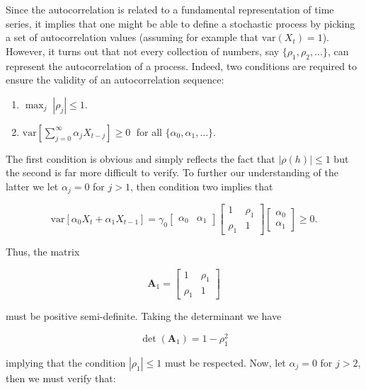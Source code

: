\documentclass[]{book}
\providecommand{\tightlist}{%
  \setlength{\itemsep}{0pt}\setlength{\parskip}{0pt}}
\theoremstyle{definition}
\theoremstyle{definition}
\theoremstyle{definition}
\theoremstyle{remark}
\begin{document}
Since the autocorrelation is related to a fundamental representation of
time series, it implies that one might be able to define a stochastic
process by picking a set of autocorrelation values (assuming for example
that \(\text{var}(X_t) = 1\)). However, it turns out that not every
collection of numbers, say \(\{\rho_1, \rho_2, ...\}\), can represent
the autocorrelation of a process. Indeed, two conditions are required to
ensure the validity of an autocorrelation sequence:

\begin{enumerate}
\def\labelenumi{\arabic{enumi}.}
\tightlist
\item
  \(\operatorname{max}_j \; | \rho_j| \leq 1\).
\item
  \(\text{var} \left[\sum_{j = 0}^\infty \alpha_j X_{t-j} \right] \geq 0 \;\)
  for all \(\{\alpha_0, \alpha_1, ...\}\).
\end{enumerate}

The first condition is obvious and simply reflects the fact that
\(|\rho \left( h \right)| \leq 1\) but the second is far more difficult
to verify. To further our understanding of the latter we let
\(\alpha_j = 0\) for \(j > 1\), then condition two implies that

\[\text{var} \left[ \alpha_0 X_{t} + \alpha_1 X_{t-1}  \right] = \gamma_0 \begin{bmatrix}
   \alpha_0 & \alpha_1
   \end{bmatrix}   \begin{bmatrix}
   1 & \rho_1\\
   \rho_1 & 1
   \end{bmatrix} \begin{bmatrix}
   \alpha_0 \\
   \alpha_1
   \end{bmatrix} \geq 0. \]

Thus, the matrix

\[ \boldsymbol{A}_1 = \begin{bmatrix}
  1 & \rho_1\\
  \rho_1 & 1
  \end{bmatrix} \]

must be positive semi-definite. Taking the determinant we have

\[\operatorname{det} \left(\boldsymbol{A}_1\right) = 1 - \rho_1^2 \]

implying that the condition \(|\rho_1| \leq 1\) must be respected. Now,
let \(\alpha_j = 0\) for \(j > 2\), then we must verify that:
\end{document}
